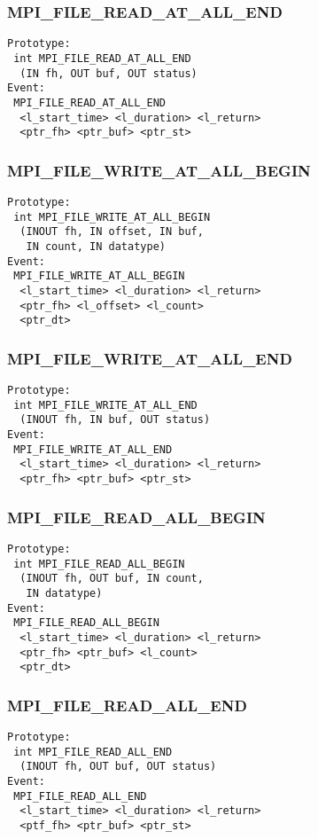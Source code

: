 \documentclass{article}
\begin{document}
\subsubsection{MPI\_FILE\_READ\_AT\_ALL\_END}
\label{sec:MPIFILEREADATALLEND}
\begin{verbatim}
Prototype:
 int MPI_FILE_READ_AT_ALL_END
  (IN fh, OUT buf, OUT status)
Event:
 MPI_FILE_READ_AT_ALL_END 
  <l_start_time> <l_duration> <l_return>
  <ptr_fh> <ptr_buf> <ptr_st>
\end{verbatim}

\subsubsection{MPI\_FILE\_WRITE\_AT\_ALL\_BEGIN}
\label{sec:MPIFILEWRITEATALLBEGIN}
\begin{verbatim}
Prototype:
 int MPI_FILE_WRITE_AT_ALL_BEGIN
  (INOUT fh, IN offset, IN buf, 
   IN count, IN datatype)
Event:
 MPI_FILE_WRITE_AT_ALL_BEGIN 
  <l_start_time> <l_duration> <l_return>
  <ptr_fh> <l_offset> <l_count>
  <ptr_dt>
\end{verbatim}

\subsubsection{MPI\_FILE\_WRITE\_AT\_ALL\_END}
\label{sec:MPIFILEWRITEATALLEND}
\begin{verbatim}
Prototype:
 int MPI_FILE_WRITE_AT_ALL_END
  (INOUT fh, IN buf, OUT status)
Event:
 MPI_FILE_WRITE_AT_ALL_END 
  <l_start_time> <l_duration> <l_return>
  <ptr_fh> <ptr_buf> <ptr_st>
\end{verbatim}

\subsubsection{MPI\_FILE\_READ\_ALL\_BEGIN}
\label{sec:MPIFILEREADALLBEGIN}
\begin{verbatim}
Prototype:
 int MPI_FILE_READ_ALL_BEGIN
  (INOUT fh, OUT buf, IN count, 
   IN datatype)
Event:
 MPI_FILE_READ_ALL_BEGIN 
  <l_start_time> <l_duration> <l_return>
  <ptr_fh> <ptr_buf> <l_count>
  <ptr_dt>
\end{verbatim}

\subsubsection{MPI\_FILE\_READ\_ALL\_END}
\label{sec:MPIFILEREADALLEND}
\begin{verbatim}
Prototype:
 int MPI_FILE_READ_ALL_END
  (INOUT fh, OUT buf, OUT status)
Event:
 MPI_FILE_READ_ALL_END 
  <l_start_time> <l_duration> <l_return>
  <ptf_fh> <ptr_buf> <ptr_st>
\end{verbatim}
\end{document}
